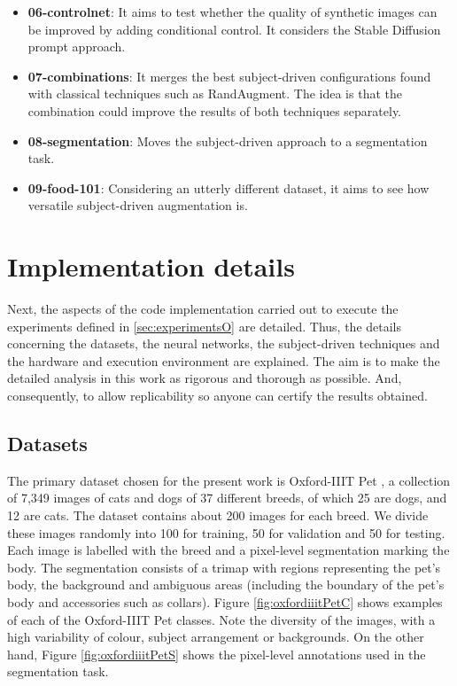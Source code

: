 \begin{itemize}
    \item \textbf{06-controlnet}: It aims to test whether the quality of synthetic images can be improved by adding conditional control. It considers the Stable Diffusion prompt approach. 
    \item \textbf{07-combinations}: It merges the best subject-driven configurations found with classical techniques such as RandAugment. The idea is that the combination could improve the results of both techniques separately.
    \item \textbf{08-segmentation}: Moves the subject-driven approach to a segmentation task. 
    \item \textbf{09-food-101}: Considering an utterly different dataset, it aims to see how versatile subject-driven augmentation is.
\end{itemize}

\section{Implementation details} \label{sec: implemantationD}

Next, the aspects of the code implementation carried out to execute the experiments defined in \ref{sec:experimentsO} are detailed. Thus, the details concerning the datasets, the neural networks, the subject-driven techniques and the hardware and execution environment are explained. The aim is to make the detailed analysis in this work as rigorous and thorough as possible. And, consequently, to allow replicability so anyone can certify the results obtained.

\subsection{Datasets}

The primary dataset chosen for the present work is Oxford-IIIT Pet \cite{Parkhi2012CatsAD}, a collection of 7,349 images of cats and dogs of 37 different breeds, of which 25 are dogs, and 12 are cats. The dataset contains about 200 images for each breed. We divide these images randomly into 100 for training, 50 for validation and 50 for testing. Each image is labelled with the breed and a pixel-level segmentation marking the body. The segmentation consists of a trimap with regions representing the pet's body, the background and ambiguous areas (including the boundary of the pet's body and accessories such as collars). Figure \ref{fig:oxfordiiitPetC} shows examples of each of the Oxford-IIIT Pet classes. Note the diversity of the images, with a high variability of colour, subject arrangement or backgrounds. On the other hand, Figure \ref{fig:oxfordiiitPetS} shows the pixel-level annotations used in the segmentation task. 

